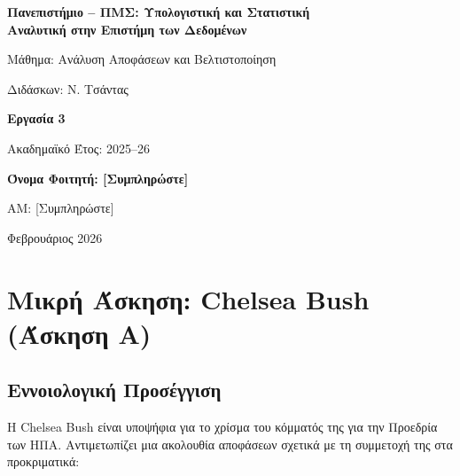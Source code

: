 \documentclass[a4paper,12pt]{article}
\begin{document}
\begin{titlepage}
\centering
\vspace*{2cm}

{\LARGE\bfseries Πανεπιστήμιο -- ΠΜΣ: Υπολογιστική και Στατιστική\\Αναλυτική στην Επιστήμη των Δεδομένων}

\vspace{1cm}

{\Large Μάθημα: Ανάλυση Αποφάσεων και Βελτιστοποίηση}

\vspace{0.5cm}

{\large Διδάσκων: Ν. Τσάντας}

\vspace{2cm}

{\Huge\bfseries Εργασία 3}

\vspace{1cm}

{\Large Ακαδημαϊκό Έτος: 2025--26}

\vspace{3cm}

{\Large\bfseries Όνομα Φοιτητή: [Συμπληρώστε]}

\vspace{0.5cm}

{\large ΑΜ: [Συμπληρώστε]}

\vfill

{\large Φεβρουάριος 2026}
\end{titlepage}

\tableofcontents
\newpage

\section{Μικρή Άσκηση: Chelsea Bush (Άσκηση A)}

\subsection{Εννοιολογική Προσέγγιση}

Η Chelsea Bush είναι υποψήφια για το χρίσμα του κόμματός της για την Προεδρία των ΗΠΑ. Αντιμετωπίζει μια ακολουθία αποφάσεων σχετικά με τη συμμετοχή της στα προκριματικά:
\end{document}
